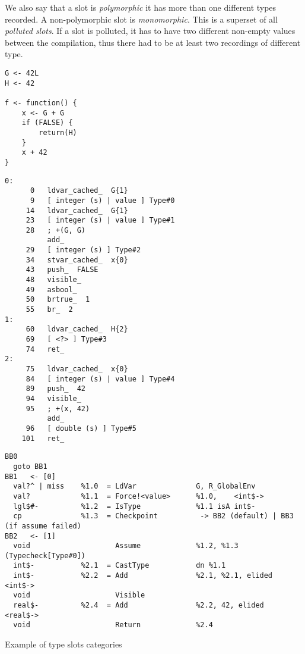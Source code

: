 We also say that a slot is \textit{polymorphic} it has more than one different types recorded. A non-polymorphic slot is \textit{monomorphic}. This is a superset of all \textit{polluted slots}. If a slot is polluted, it has to have two different non-empty values between the compilation, thus there had to be at least two recordings of different type.


\begin{listing}[p]
	\begin{minipage}{0.47\textwidth}
		\begin{verbatim}
G <- 42L
H <- 42

f <- function() {
    x <- G + G
    if (FALSE) {
        return(H)
    }
    x + 42
}
    \end{verbatim}
	\end{minipage}
	\hfill
	\begin{minipage}{0.47\textwidth}
		\begin{verbatim}
0:
      0   ldvar_cached_  G{1}
      9   [ integer (s) | value ] Type#0
     14   ldvar_cached_  G{1}
     23   [ integer (s) | value ] Type#1
     28   ; +(G, G)
          add_
     29   [ integer (s) ] Type#2
     34   stvar_cached_  x{0}
     43   push_  FALSE
     48   visible_
     49   asbool_
     50   brtrue_  1
     55   br_  2
1:
     60   ldvar_cached_  H{2}
     69   [ <?> ] Type#3
     74   ret_
2:
     75   ldvar_cached_  x{0}
     84   [ integer (s) | value ] Type#4
     89   push_  42
     94   visible_
     95   ; +(x, 42)
          add_
     96   [ double (s) ] Type#5
    101   ret_
    \end{verbatim}
	\end{minipage}
	\vfill
	\begin{adjustwidth}{-1cm}{-1cm}
		\begin{minipage}{\textwidth}
			\begin{verbatim}
BB0
  goto BB1
BB1   <- [0]
  val?^ | miss    %1.0  = LdVar              G, R_GlobalEnv
  val?            %1.1  = Force!<value>      %1.0,    <int$->
  lgl$#-          %1.2  = IsType             %1.1 isA int$-
  cp              %1.3  = Checkpoint          -> BB2 (default) | BB3 (if assume failed)
BB2   <- [1]
  void                    Assume             %1.2, %1.3 (Typecheck[Type#0])
  int$-           %2.1  = CastType           dn %1.1
  int$-           %2.2  = Add                %2.1, %2.1, elided   <int$->
  void                    Visible
  real$-          %2.4  = Add                %2.2, 42, elided   <real$->
  void                    Return             %2.4
      \end{verbatim}
		\end{minipage}
		\caption{Example of type slots categories}
	\end{adjustwidth}
\end{listing}

